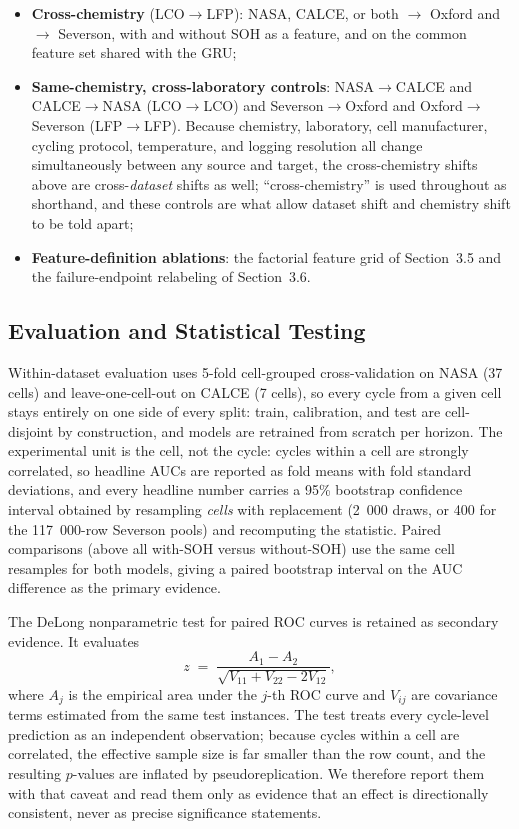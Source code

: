 \documentclass[IJPHM, 2014, 00]{PHMSociety}
\begin{document}
\begin{itemize}
\item \textbf{Cross-chemistry} (LCO$\to$LFP): NASA, CALCE, or both $\to$ Oxford and $\to$ Severson, with and without SOH as a feature, and on the common feature set shared with the GRU;
\item \textbf{Same-chemistry, cross-laboratory controls}: NASA$\to$CALCE and CALCE$\to$NASA (LCO$\to$LCO) and Severson$\to$Oxford and Oxford$\to$Severson (LFP$\to$LFP). Because chemistry, laboratory, cell manufacturer, cycling protocol, temperature, and logging resolution all change simultaneously between any source and target, the cross-chemistry shifts above are cross-\emph{dataset} shifts as well; ``cross-chemistry'' is used throughout as shorthand, and these controls are what allow dataset shift and chemistry shift to be told apart;
\item \textbf{Feature-definition ablations}: the factorial feature grid of Section~3.5 and the failure-endpoint relabeling of Section~3.6.
\end{itemize}

\subsection{Evaluation and Statistical Testing}
\label{sec:eval}
Within-dataset evaluation uses 5-fold cell-grouped cross-validation on NASA (37 cells) and leave-one-cell-out on CALCE (7 cells), so every cycle from a given cell stays entirely on one side of every split: train, calibration, and test are cell-disjoint by construction, and models are retrained from scratch per horizon. The experimental unit is the cell, not the cycle: cycles within a cell are strongly correlated, so headline AUCs are reported as fold means with fold standard deviations, and every headline number carries a 95\% bootstrap confidence interval obtained by resampling \emph{cells} with replacement (2~000 draws, or 400 for the 117~000-row Severson pools) and recomputing the statistic. Paired comparisons (above all with-SOH versus without-SOH) use the same cell resamples for both models, giving a paired bootstrap interval on the AUC difference as the primary evidence.

The DeLong nonparametric test \cite{delong1988comparing} for paired ROC curves is retained as secondary evidence. It evaluates
\begin{equation}\label{eq:delong}
z \;=\; \frac{A_1 - A_2}{\sqrt{V_{11}+V_{22}-2V_{12}}},
\end{equation}
where $A_j$ is the empirical area under the $j$-th ROC curve and $V_{ij}$ are covariance terms estimated from the same test instances. The test treats every cycle-level prediction as an independent observation; because cycles within a cell are correlated, the effective sample size is far smaller than the row count, and the resulting $p$-values are inflated by pseudoreplication. We therefore report them with that caveat and read them only as evidence that an effect is directionally consistent, never as precise significance statements.
\end{document}
